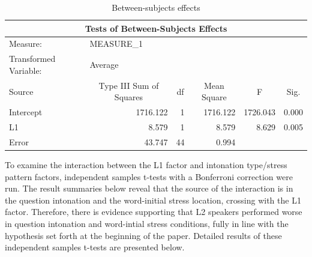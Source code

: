 \documentclass[a4paper]{article}
\begin{document}
\begin{table}[H]
\begin{center}
    \caption{Between-subjects effects}
\begin{tabular}{|l|r|r|r|l|l|} 
\hline
\multicolumn{6}{|c|}{Tests of Between-Subjects Effects}                                                                                                                                          \\ 
\hline
Measure:~              & \multicolumn{1}{l|}{MEASURE\_1}              & \multicolumn{1}{l|}{}   & \multicolumn{1}{l|}{}            &                               &                             \\ 
\hline
Transformed Variable:~ & \multicolumn{1}{l|}{Average}                 & \multicolumn{1}{l|}{}   & \multicolumn{1}{l|}{}            &                               &                             \\ 
\hline
Source                 & \multicolumn{1}{c|}{Type III Sum of Squares} & \multicolumn{1}{c|}{df} & \multicolumn{1}{c|}{Mean Square} & \multicolumn{1}{c|}{F}        & \multicolumn{1}{c|}{Sig.}   \\ 
\hline
Intercept              & 1716.122                                     & 1                       & 1716.122                         & \multicolumn{1}{r|}{1726.043} & \multicolumn{1}{r|}{0.000}  \\ 
\hline
L1                     & 8.579                                        & 1                       & 8.579                            & \multicolumn{1}{r|}{8.629}    & \multicolumn{1}{r|}{0.005}  \\ 
\hline
Error                  & 43.747                                       & 44                      & 0.994                            & ~                             & ~                           \\
\hline
\end{tabular}
\end{center}
\end{table}

To examine the interaction between the L1 factor and intonation type/stress pattern factors, independent samples t-tests with a Bonferroni correction were run. The result summaries below reveal that the source of the interaction is in the question intonation and the word-initial stress location, crossing with the L1 factor. Therefore, there is evidence supporting that L2 speakers performed worse in question intonation and word-intial stress conditions, fully in line with the hypothesis set forth at the beginning of the paper. Detailed results of these independent samples t-tests are presented below.
\end{document}
